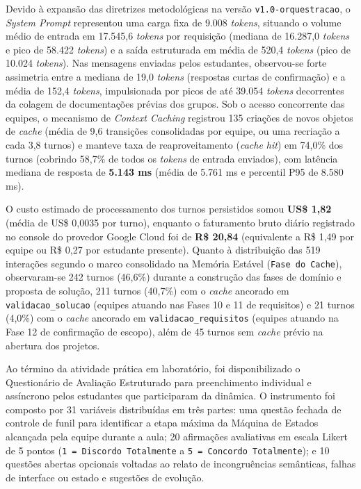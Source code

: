 Devido à expansão das diretrizes metodológicas na versão \texttt{v1.0-orquestracao}, o \textit{System Prompt} representou uma carga fixa de 9.008 \textit{tokens}, situando o volume médio de entrada em 17.545,6 \textit{tokens} por requisição (mediana de 16.287,0 \textit{tokens} e pico de 58.422 \textit{tokens}) e a saída estruturada em média de 520,4 \textit{tokens} (pico de 10.024 \textit{tokens}). Nas mensagens enviadas pelos estudantes, observou-se forte assimetria entre a mediana de 19,0 \textit{tokens} (respostas curtas de confirmação) e a média de 152,4 \textit{tokens}, impulsionada por picos de até 39.054 \textit{tokens} decorrentes da colagem de documentações prévias dos grupos. Sob o acesso concorrente das equipes, o mecanismo de \textit{Context Caching} registrou 135 criações de novos objetos de \textit{cache} (média de 9,6 transições consolidadas por equipe, ou uma recriação a cada 3,8 turnos) e manteve taxa de reaproveitamento (\textit{cache hit}) em 74,0\% dos turnos (cobrindo 58,7\% de todos os \textit{tokens} de entrada enviados), com latência mediana de resposta de \textbf{5.143 ms} (média de 5.761 ms e percentil P95 de 8.580 ms).

O custo estimado de processamento dos turnos persistidos somou \textbf{US\$ 1,82} (média de US\$ 0,0035 por turno), enquanto o faturamento bruto diário registrado no console do provedor Google Cloud foi de \textbf{R\$ 20,84} (equivalente a R\$ 1,49 por equipe ou R\$ 0,27 por estudante presente). Quanto à distribuição das 519 interações segundo o marco consolidado na Memória Estável (\texttt{Fase do Cache}), observaram-se 242 turnos (46,6\%) durante a construção das fases de domínio e proposta de solução, 211 turnos (40,7\%) com o \textit{cache} ancorado em \texttt{validacao\_solucao} (equipes atuando nas Fases 10 e 11 de requisitos) e 21 turnos (4,0\%) com o \textit{cache} ancorado em \texttt{validacao\_requisitos} (equipes atuando na Fase 12 de confirmação de escopo), além de 45 turnos sem \textit{cache} prévio na abertura dos projetos.

Ao término da atividade prática em laboratório, foi disponibilizado o Questionário de Avaliação Estruturado para preenchimento individual e assíncrono pelos estudantes que participaram da dinâmica. O instrumento foi composto por 31 variáveis distribuídas em três partes: uma questão fechada de controle de funil para identificar a etapa máxima da Máquina de Estados alcançada pela equipe durante a aula; 20 afirmações avaliativas em escala Likert de 5 pontos (\texttt{1 = Discordo Totalmente} a \texttt{5 = Concordo Totalmente}); e 10 questões abertas opcionais voltadas ao relato de incongruências semânticas, falhas de interface ou estado e sugestões de evolução.

